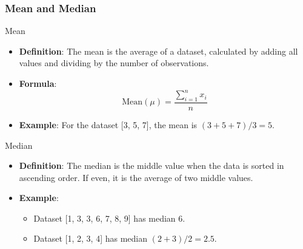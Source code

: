 \documentclass{beamer}
\begin{document}
\begin{frame}[fragile]
    \frametitle{Mean and Median}
    \begin{block}{Mean}
        \begin{itemize}
            \item \textbf{Definition}: The mean is the average of a dataset, calculated by adding all values and dividing by the number of observations.
            \item \textbf{Formula}:
            \[
            \text{Mean} (\mu) = \frac{\sum_{i=1}^{n} x_i}{n}
            \]
            \item \textbf{Example}: For the dataset [3, 5, 7], the mean is \((3 + 5 + 7) / 3 = 5\).
        \end{itemize}
    \end{block}
    
    \begin{block}{Median}
        \begin{itemize}
            \item \textbf{Definition}: The median is the middle value when the data is sorted in ascending order. If even, it is the average of two middle values.
            \item \textbf{Example}: 
            \begin{itemize}
                \item Dataset [1, 3, 3, 6, 7, 8, 9] has median 6.
                \item Dataset [1, 2, 3, 4] has median \((2 + 3) / 2 = 2.5\).
            \end{itemize}
        \end{itemize}
    \end{block}
\end{frame}
\end{document}
